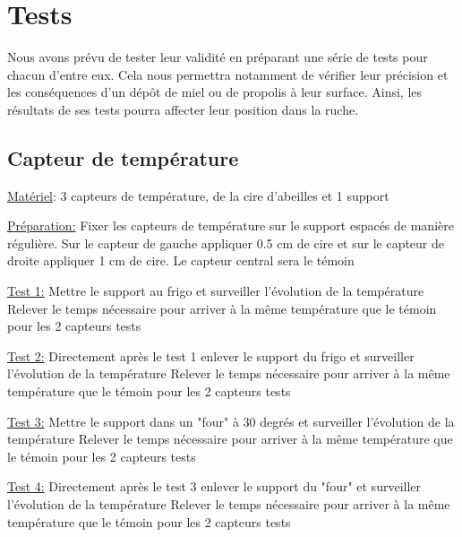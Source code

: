 \chapter{Tests}

Nous avons prévu de tester leur validité en préparant une série de tests pour chacun d'entre eux. Cela nous permettra notamment de vérifier leur précision et les conséquences d'un dépôt de miel ou de propolis à leur surface. Ainsi, les résultats de ses tests pourra affecter leur position dans la ruche. 

\section{Capteur de température}

\noindent \underline{Matériel}:   
3 capteurs de température, de la cire d'abeilles et 1 support\newline  

\noindent \underline{Préparation:} \newline 
Fixer les capteurs de température sur le support espacés de manière régulière. Sur le capteur de gauche appliquer 0.5 cm de cire et sur le capteur de droite appliquer 1 cm de cire. Le capteur central sera le témoin \newline

\noindent \underline{Test 1:} \newline 
Mettre le support au frigo et surveiller l'évolution de la température\newline   
Relever le temps nécessaire pour arriver à la même température que le témoin pour les 2 capteurs tests  

\noindent \underline{Test 2:}  \newline 
Directement après le test 1 enlever le support du frigo et surveiller l'évolution de la température\newline   
Relever le temps nécessaire pour arriver à la même température que le témoin pour les 2 capteurs tests

\noindent \underline{Test 3:}  \newline 
Mettre le support dans un "four" à 30 degrés et surveiller l'évolution de la température\newline   
Relever le temps nécessaire pour arriver à la même température que le témoin pour les 2 capteurs tests  
  
\noindent \underline{Test 4:}  \newline 
Directement après le test 3 enlever le support du "four" et surveiller l'évolution de la température\newline   
Relever le temps nécessaire pour arriver à la même température que le témoin pour les 2 capteurs tests

